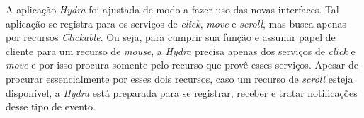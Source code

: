 A aplicação \emph{Hydra} foi ajustada de modo a fazer uso das novas interfaces. Tal aplicação se registra para os serviços de \emph{click}, \emph{move} e \emph{scroll}, mas busca apenas por recursos \emph{Clickable}. Ou seja, para cumprir sua função e assumir papel de cliente para um recurso de \emph{mouse}, a \emph{Hydra} precisa apenas dos serviços de \emph{click} e \emph{move} e por isso procura somente pelo recurso que provê esses serviços. Apesar de procurar essencialmente por esses dois recursos, caso um recurso de \emph{scroll} esteja disponível, a \emph{Hydra} está preparada para se registrar, receber e tratar notificações desse tipo de evento.
 
